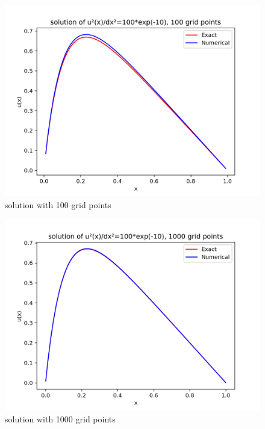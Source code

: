 \documentclass{article}
\begin{document}
\begin{figure}
  \includegraphics[width=\linewidth]{100gridpoints.png}
  \caption{solution with 100 grid points}
  \label{fig:100 grid points}
\end{figure}

\begin{figure}
  \includegraphics[width=\linewidth]{1000gridpoints.png}
  \caption{solution with 1000 grid points}
  \label{fig:1000 grid points}
\end{figure}
\end{document}

